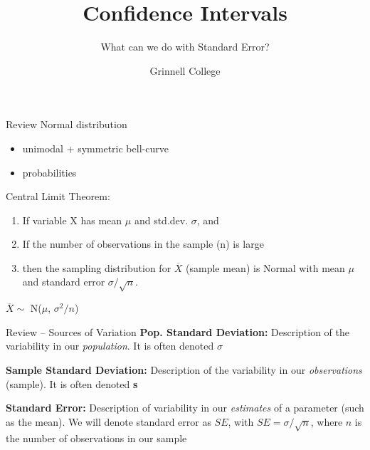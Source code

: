 \documentclass{beamer}
\title[Introduction to Statistics]{Confidence Intervals}
\subtitle{What can we do with Standard Error?}
\author{Grinnell College}
\date{}
\begin{document}
\begin{frame}
  \titlepage
\end{frame}

\begin{frame}{Review}
Normal distribution
\begin{itemize}
    \item unimodal + symmetric bell-curve
    \item probabilities
\end{itemize} \vspace{6mm}

Central Limit Theorem:
\begin{enumerate}
    \item If variable X has mean $\mu$ and std.dev. $\sigma$, and
    \item If the number of observations in the sample (n) is large
    \item then the sampling distribution for $\overline{X}$ (sample mean) is Normal with mean $\mu$ and standard error $\sigma / \sqrt{n}$.
\end{enumerate}
\begin{center}
    $\overline{X} \sim$ N($\mu$, $\sigma^2 / n$)
\end{center}
\end{frame}

\begin{frame}{Review -- Sources of Variation}
\textbf{Pop. Standard Deviation:} Description of the variability in our \textit{population}. It is often denoted \textbf{$\sigma$} \vspace{8mm}

\textbf{Sample Standard Deviation:} Description of the variability in our \textit{observations} (sample). It is often denoted \textbf{s} \vspace{8mm}

\textbf{Standard Error: } Description of variability in our \textit{estimates} of a parameter (such as the mean). We will denote standard error as $SE$, with $SE = \sigma / \sqrt{n}$, where $n$ is the number of observations in our sample
\end{frame}
\end{document}
